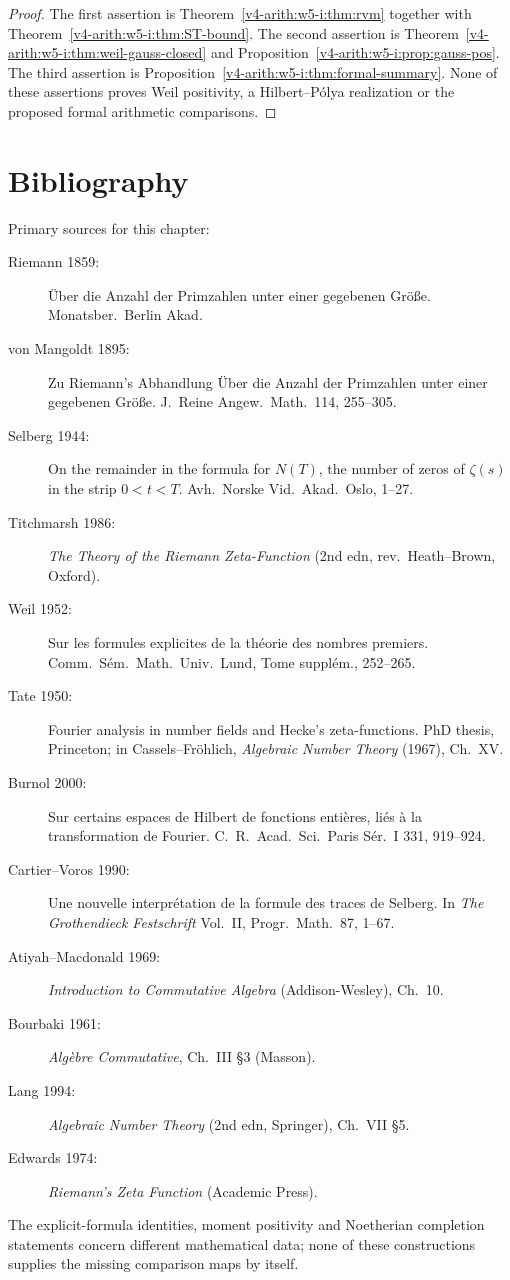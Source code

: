 \begin{proof}
The first assertion is Theorem~\ref{v4-arith:w5-i:thm:rvm} together with
Theorem~\ref{v4-arith:w5-i:thm:ST-bound}. The second assertion is
Theorem~\ref{v4-arith:w5-i:thm:weil-gauss-closed} and
Proposition~\ref{v4-arith:w5-i:prop:gauss-pos}. The third assertion is
Proposition~\ref{v4-arith:w5-i:thm:formal-summary}.
None of these assertions proves Weil positivity, a Hilbert--P\'olya
realization or the proposed formal arithmetic comparisons.
\end{proof}

\section{Bibliography}
\label{v4-arith:w5-i:bibliography}

Primary sources for this chapter:

\begin{description}
\item[Riemann 1859:] \"Uber die Anzahl der Primzahlen unter einer
gegebenen Gr\"o{\ss}e. Monatsber.~Berlin Akad.
\item[von Mangoldt 1895:] Zu Riemann's Abhandlung \"Uber die Anzahl
der Primzahlen unter einer gegebenen Gr\"o{\ss}e.
J.~Reine Angew.~Math.~114, 255--305.
\item[Selberg 1944:] On the remainder in the formula for \(N(T)\),
the number of zeros of \(\zeta(s)\) in the strip \(0<t<T\).
Avh.~Norske Vid.~Akad.~Oslo, 1--27.
\item[Titchmarsh 1986:] \emph{The Theory of the Riemann Zeta-Function}
(2nd edn, rev.~Heath--Brown, Oxford).
\item[Weil 1952:] Sur les formules explicites de la th\'eorie des
nombres premiers. Comm.~S\'em.~Math.~Univ.~Lund, Tome suppl\'em.,
252--265.
\item[Tate 1950:] Fourier analysis in number fields and Hecke's
zeta-functions. PhD thesis, Princeton; in Cassels--Fr\"ohlich,
\emph{Algebraic Number Theory} (1967), Ch.~XV.
\item[Burnol 2000:] Sur certains espaces de Hilbert de fonctions
enti\`eres, li\'es \`a la transformation de Fourier.
C.~R.~Acad.~Sci.~Paris S\'er.~I 331, 919--924.
\item[Cartier--Voros 1990:] Une nouvelle interpr\'etation de la formule
des traces de Selberg. In \emph{The Grothendieck Festschrift} Vol.~II,
Progr.~Math.~87, 1--67.
\item[Atiyah--Macdonald 1969:] \emph{Introduction to Commutative
Algebra} (Addison-Wesley), Ch.~10.
\item[Bourbaki 1961:] \emph{Alg\`ebre Commutative}, Ch.~III \S3
(Masson).
\item[Lang 1994:] \emph{Algebraic Number Theory} (2nd edn, Springer),
Ch.~VII \S5.
\item[Edwards 1974:] \emph{Riemann's Zeta Function} (Academic Press).
\end{description}

The explicit-formula identities, moment positivity and Noetherian
completion statements concern different mathematical data; none of
these constructions supplies the missing comparison maps by itself.

